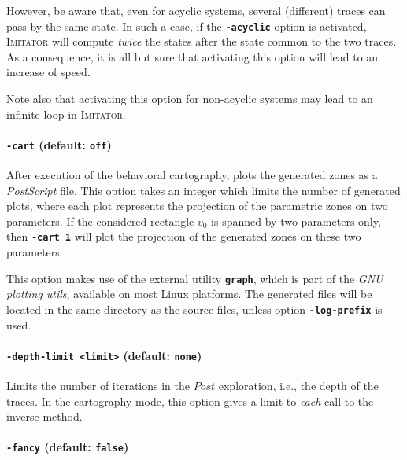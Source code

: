 \documentclass[a4paper,11pt]{article}
\newcommand{\imitator}{\textsc{Imitator}}
\newcommand{\code}[1]{\textbf{\texttt{#1}}}
\begin{document}
However, be aware that, even for acyclic systems, several (different) traces can pass by the same state.
In such a case, if the \code{-acyclic} option is activated, \imitator{} will compute \emph{twice} the states after the state common to the two traces.
As a consequence, it is all but sure that activating this option will lead to an increase of speed.

Note also that activating this option for non-acyclic systems may lead to an infinite loop in \imitator{}.

\paragraph{\code{-cart} (default: \code{off})}

After execution of the behavioral cartography, plots the generated
zones as a \emph{PostScript} file. This option takes an integer which
limits the number of generated plots, where each plot represents the
projection of the parametric zones on two parameters. If the
considered rectangle $v_0$ is spanned by two parameters only, then
\code{-cart 1} will plot the projection of the generated zones on
these two parameters. 

This option makes use of the external utility \code{graph}, which is
part of the \emph{GNU plotting utils}, available on most Linux
platforms. The generated files will be located in the same directory
as the source files, unless option \code{-log-prefix} is used.

\paragraph{\code{-depth-limit <limit>} (default: \code{none})}
Limits the number of iterations in the $\mathit{Post}$ exploration, i.e., the depth of the traces.
In the cartography mode, this option gives a limit to \emph{each} call to the inverse method.

\paragraph{\code{-fancy} (default: \code{false})}
\end{document}
